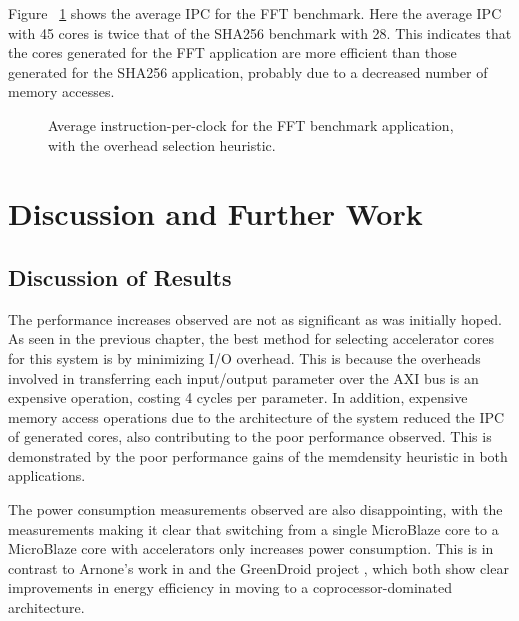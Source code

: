 \documentclass{UoYCSproject}
\begin{document}
Figure ~\ref{fig:ipcFFT} shows the average IPC for the FFT benchmark.
Here the average IPC with 45 cores is twice that of the SHA256 benchmark with 28.
This indicates that the cores generated for the FFT application are more efficient
than those generated for the SHA256 application, probably due to a decreased number of memory
accesses.

\begin{figure}[H]
\caption{Average instruction-per-clock for the FFT benchmark application, with the overhead selection heuristic.}
\label{fig:ipcFFT}
\end{figure}

\chapter{Discussion and Further Work}

\section{Discussion of Results}

The performance increases observed are not as significant as was initially hoped.
As seen in the previous chapter, the best method for selecting accelerator cores for this system is by minimizing
I/O overhead. This is because the overheads involved in transferring each input/output parameter over the AXI bus is an
expensive operation, costing 4 cycles per parameter. In addition, expensive memory access operations
due to the architecture of the system reduced the IPC of generated cores, also contributing to
the poor performance observed. This is demonstrated by the poor performance gains of the memdensity heuristic in
both applications.

The power consumption measurements observed are also disappointing, with the measurements making it clear that
switching from a single MicroBlaze core to a MicroBlaze core with accelerators only increases power consumption.
This is in contrast to Arnone's work in \cite{arnone-thesis} and the GreenDroid project \cite{greendroid},
which both show clear improvements in energy efficiency in moving to a coprocessor-dominated architecture.
\end{document}
